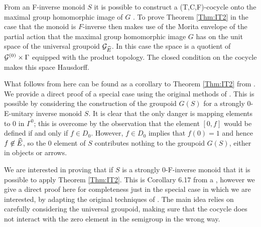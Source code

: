 From an F-inverse monoid $S$ it is possible to construct a (T,C,F)-cocycle onto the maximal group homomorphic image of $G$ \cite{MR1900993}. To prove Theorem \ref{Thm:IT2} in the case that the monoid is $F$-inverse then makes use of the Morita envelope of the partial action that the maximal group homomorphic image $G$ has on the unit space of the universal groupoid $\mathcal{G}_{\widehat{E}}$. In this case the space is a quotient of  $\mathcal{G}^{(0)}\times \Gamma$ equipped with the product topology.  The closed condition on the cocycle makes this space Hausdorff.

What follows from here can be found as a corollary to Theorem \ref{Thm:IT2} from \cite{Milan-Steinberg}. We provide a direct proof of a special case using the original methods of \cite{MR1900993}. This is possible by considering the construction of the groupoid $G(S)$ for a strongly 0-E-unitary inverse monoid $S$. It is clear that the only danger is mapping elements to $0$ in $\Gamma^{0}$; this is overcome by the observation that the element $[0,f]$ would be defined if and only if $f \in D_{0}$. However, $f \in D_{0}$ implies that $f(0)=1$ and hence $f \not\in \widehat{E}$, so the $0$ element of $S$ contributes nothing to the groupoid $G(S)$, either in objects or arrows.

We are interested in proving that if $S$ is a strongly $0$-F-inverse monoid that it is possible to apply Theorem \ref{Thm:IT2}. This is Corollary 6.17 from a \cite{Milan-Steinberg}, however we give a direct proof here for completeness just in the special case in which we are interested, by adapting the original techniques of \cite{MR1900993}. The main idea relies on carefully considering the universal groupoid, making sure that the cocycle does not interact with the zero element in the semigroup in the wrong way.

